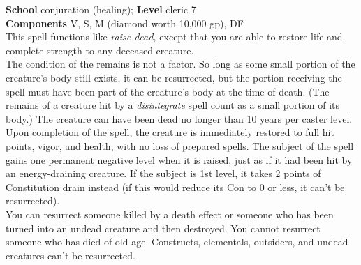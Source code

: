\textbf{School }conjuration (healing); \textbf{Level }cleric 7\\
\textbf{Components }V, S, M (diamond worth 10,000 gp), DF\\
This spell functions like \textit{raise dead, }except that you are able to restore life and complete strength to any deceased creature.\\
The condition of the remains is not a factor. So long as some small portion of the creature's body still exists, it can be resurrected, but the portion receiving the spell must have been part of the creature's body at the time of death. (The remains of a creature hit by a \textit{disintegrate }spell count as a small portion of its body.) The creature can have been dead no longer than 10 years per caster level.\\
Upon completion of the spell, the creature is immediately restored to full hit points, vigor, and health, with no loss of prepared spells. The subject of the spell gains one permanent negative level when it is raised, just as if it had been hit by an energy-draining creature. If the subject is 1st level, it takes 2 points of Constitution drain instead (if this would reduce its Con to 0 or less, it can't be resurrected). \\
You can resurrect someone killed by a death effect or someone who has been turned into an undead creature and then destroyed. You cannot resurrect someone who has died of old age. Constructs, elementals, outsiders, and undead creatures can't be resurrected.\\

